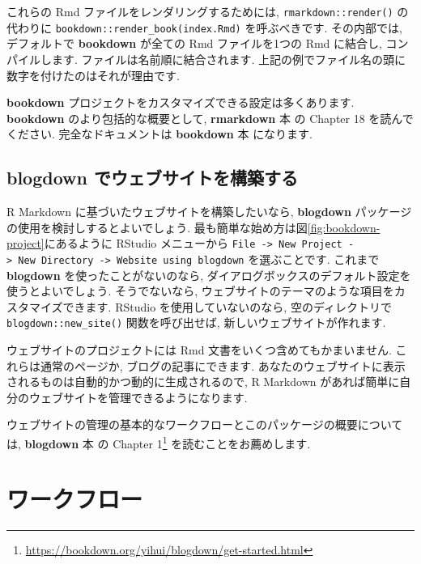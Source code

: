 \documentclass[
  11pt,
  lualatex,
  ja=standard]{bxjsreport}
\renewcommand{\href}[2]{#2\footnote{\url{#1}}}
\begin{document}
これらの Rmd ファイルをレンダリングするためには, \texttt{rmarkdown::render()} の代わりに \texttt{bookdown::render\_book(\textquotesingle{}index.Rmd\textquotesingle{})} を呼ぶべきです. その内部では, デフォルトで \textbf{bookdown} が全ての Rmd ファイルを1つの Rmd に結合し, コンパイルします. ファイルは名前順に結合されます. 上記の例でファイル名の頭に数字を付けたのはそれが理由です.

\textbf{bookdown} プロジェクトをカスタマイズできる設定は多くあります. \textbf{bookdown} のより包括的な概要として, \textbf{rmarkdown} 本 \autocite{rmarkdown2018} の Chapter 18 を読んでください. 完全なドキュメントは \textbf{bookdown} 本 \autocite{bookdown2016} になります.

\hypertarget{blogdown}{%
\section{\texorpdfstring{\textbf{blogdown} でウェブサイトを構築する}{blogdown でウェブサイトを構築する}}\label{blogdown}}

R Markdown に基づいたウェブサイトを構築したいなら, \textbf{blogdown} パッケージ \autocite{R-blogdown} の使用を検討しするとよいでしょう. 最も簡単な始め方は図\ref{fig:bookdown-project}にあるように RStudio メニューから \texttt{File -\textgreater{}\ New\ Project\ -\textgreater{}\ New\ Directory\ -\textgreater{}\ Website\ using\ blogdown} を選ぶことです. これまで \textbf{blogdown} を使ったことがないのなら, ダイアログボックスのデフォルト設定を使うとよいでしょう. そうでないなら, ウェブサイトのテーマのような項目をカスタマイズできます. RStudio を使用していないのなら, 空のディレクトリで \texttt{blogdown::new\_site()} 関数を呼び出せば, 新しいウェブサイトが作れます.

ウェブサイトのプロジェクトには Rmd 文書をいくつ含めてもかまいません. これらは通常のページか, ブログの記事にできます. あなたのウェブサイトに表示されるものは自動的かつ動的に生成されるので, R Markdown があれば簡単に自分のウェブサイトを管理できるようになります.

ウェブサイトの管理の基本的なワークフローとこのパッケージの概要については, \textbf{blogdown} 本 \autocite{blogdown2017} の \href{https://bookdown.org/yihui/blogdown/get-started.html}{Chapter 1} を読むことをお薦めします.

\hypertarget{workflow}{%
\chapter{ワークフロー}\label{workflow}}
\end{document}

